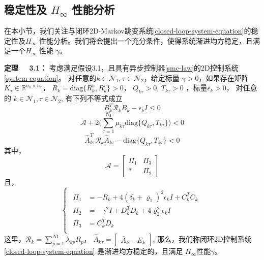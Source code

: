 \subsection{稳定性及 $H_{\infty}$ 性能分析 } \label{stability&H_infty}	
	在本小节，我们关注与闭环2D-Markov跳变系统\eqref{closed-loop-system-equation}的稳定性及$H_{\infty}$ 性能分析。我们将会提出一个充分条件，使得系统渐进均方稳定，且满足一个$H_{\infty}$ 性能 $\gamma$。
	
	{\bf 定理 \ \ 3.1：}
	考虑满足假设3.1，且具有异步控制器\eqref{smc-law}的2D控制系统\eqref{system-equation}。 对任意的$k\in\mathcal{N}_{1}, \tau\in\mathcal{N}_{2}$，给定标量 $\gamma>0$，如果存在矩阵 $K_{\tau }\in\mathbb{R}^{n_u\times n_x}$，  $R_{k}=\mathrm{diag}\{R^{h}_{k},R^{v}_{k}\}>0$，  $Q_{k\tau }>0$, $T_{k\tau }>0$ ，标量$\epsilon_{k}>0$， 对任意的 $k\in\mathcal{N}_{1}, \tau\in\mathcal{N}_{2}$,  有下列不等式成立
	\begin{equation}\label{T1C1}
	B^{T}_{k}  	\mathcal{R}_{k} B_{k} -\epsilon_{k}I \leq 0
	\end{equation}
	\begin{equation}\label{T1C2}
	\mathcal{A} +2\Big(\sum_{\tau =1}^{N_{2}}\mu_{k\tau } \mathrm{diag}\{Q_{k\tau }, T_{k\tau }\}\Big) < 0
	\end{equation}
	\begin{equation}\label{T1C3}
	\hat{A}^{T}_{k\tau }\mathcal{R}_{k}\hat{A}_{k\tau } - \mathrm{diag}\{Q_{k\tau }, T_{k\tau }\} < 0
	\end{equation}
	其中，
	\begin{equation*}
	\mathcal{A}=\begin{bmatrix}
	\varPi_{1} & \varPi_{3}\\
	*&\varPi_{2}
	\end{bmatrix}
	\end{equation*} 且，
	\begin{equation*} \label{varPi}
	\left\{
	\begin{array}{lr}
	\begin{split}
	\varPi_{1}&=-R_{k}+4(\delta_{k}+\varrho_{1})^{2}\epsilon_{k}I+C^{T}_{k}C_{k}\\
	\varPi_{2}&=-\gamma^{2}I+D^{T}_{k}D_{k}+4\varrho_{2}^{2}\epsilon_{k}I\\
	\varPi_{3}&= C_{k}^{T}D_{k}\\
	\end{split}
	\end{array}
	\right.
	\end{equation*}
	这里，$\mathcal{R}_{k}=\sum_{p=1}^{N1}\lambda_{kp}R_{p}$， $\hat{A}_{k\tau }=\begin{bmatrix}
	\bar{A}_{k\tau }& E_{k}
	\end{bmatrix}$, 
	那么，我们称闭环2D控制系统\eqref{closed-loop-system-equation} 是渐进均方稳定的，且满足 $H_{\infty}$性能$\gamma$。
	
